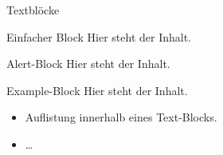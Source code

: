 
\begin{frame}{Textblöcke}

\begin{block}{Einfacher Block}
  Hier steht der Inhalt.
\end{block}

\begin{alertblock}{Alert-Block}
  Hier steht der Inhalt.
\end{alertblock}

\begin{exampleblock}{Example-Block}
  Hier steht der Inhalt.
\end{exampleblock}

\begin{example}
  \begin{itemize}
    \item Auflistung innerhalb eines Text-Blocks.
    \item \dots
  \end{itemize}
\end{example}

\end{frame}